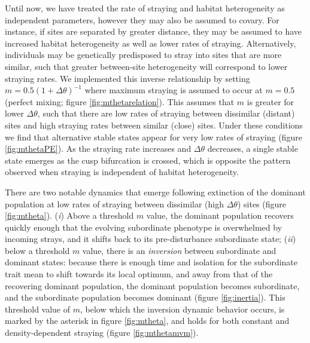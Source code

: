 \documentclass{revtex4}
\begin{document}
Until now, we have treated the rate of straying and habitat heterogeneity as independent parameters, however they may also be assumed to covary.
For instance, if sites are separated by greater distance, they may be assumed to have increased habitat heterogeneity as well as lower rates of straying.
Alternatively, individuals may be genetically predisposed to stray into sites that are more similar, such that greater between-site heterogeneity will correspond to lower straying rates.
We implemented this inverse relationship by setting $m = 0.5(1 + \Delta\theta)^{-1}$ where maximum straying is assumed to occur at $m=0.5$ (perfect mixing; figure \ref{fig:mthetarelation}).
This assumes that $m$ is greater for lower $\Delta\theta$, such that there are low rates of straying between dissimilar (distant) sites and high straying rates between similar (close) sites.
Under these conditions we find that alternative stable states appear for very low rates of straying (figure \ref{fig:mthetaPE}). %
As the straying rate increases and $\Delta\theta$ decreases, a single stable state emerges as the cusp bifurcation is crossed, which is opposite the pattern observed when straying is independent of habitat heterogeneity.

There are two notable dynamics that emerge following extinction of the dominant population at low rates of straying between dissimilar (high $\Delta\theta$) sites (figure \ref{fig:mtheta}).
(\emph{i}) Above a threshold $m$ value, the dominant population recovers quickly enough that the evolving subordinate phenotype is overwhelmed by incoming strays, and it shifts back to its pre-disturbance subordinate state;
(\emph{ii}) below a threshold $m$ value, there is an \emph{inversion} between subordinate and dominant states: because there is enough time and isolation for the subordinate trait mean to shift towards its local optimum, and away from that of the recovering dominant population, the dominant population becomes subordinate, and the subordinate population becomes dominant (figure \ref{fig:inertia}).
This threshold value of $m$, below which the inversion dynamic behavior occurs, is marked by the asterisk in figure \ref{fig:mtheta}, and holds for both constant and density-dependent straying (figure \ref{fig:mthetamvm}).
\end{document}
